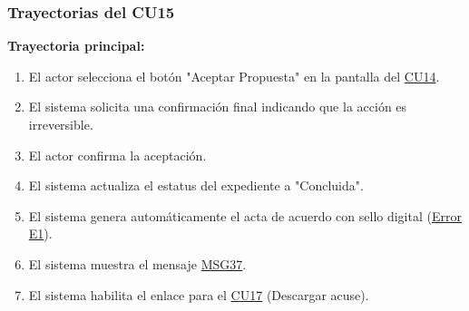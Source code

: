 \begin{appendices}
\subsubsection{Trayectorias del CU15}
\textbf{Trayectoria principal:}
\begin{enumerate}[nosep]
    \item El actor selecciona el botón "Aceptar Propuesta" en la pantalla del \hyperlink{anexo:casos_uso}{CU14}.
    \item El sistema solicita una confirmación final indicando que la acción es irreversible.
    \item El actor confirma la aceptación.
    \item El sistema actualiza el estatus del expediente a "Concluida".
    \item El sistema genera automáticamente el acta de acuerdo con sello digital (\hyperlink{err:E20}{Error E1}).
    \item El sistema muestra el mensaje \hyperlink{msg:MSG37}{MSG37}.
    \item El sistema habilita el enlace para el \hyperlink{anexo:casos_uso}{CU17} (Descargar acuse).
\end{enumerate}


\end{appendices}
